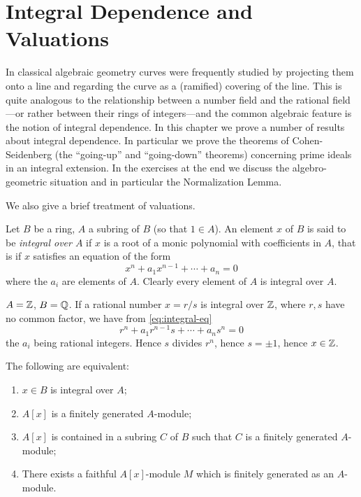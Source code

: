 \chapter{Integral Dependence and Valuations}\label{chapter5}

In classical algebraic geometry curves were frequently studied by projecting them onto a line and regarding the curve as a (ramified) covering of the line. This is quite analogous to the relationship between a number field and the rational field---or rather between their rings of integers---and the common algebraic feature is the notion of integral dependence. In this chapter we prove a number of results about integral dependence. In particular we prove the theorems of Cohen-Seidenberg (the ``going-up'' and ``going-down'' theorems) concerning prime ideals in an integral extension. In the exercises at the end we discuss the algebro-geometric situation and in particular the Normalization Lemma.

We also give a brief treatment of valuations.

Let $B$ be a ring, $A$ a subring of $B$ (so that $1 \in A$). An element $x$ of $B$ is said to be \emph{integral over $A$} if $x$ is a root of a monic polynomial with coefficients in $A$, that is if $x$ satisfies an equation of the form
\begin{equation}\label{eq:integral-eq}
x^n + a_1 x^{n-1} + \cdots + a_n = 0 \tag{1}
\end{equation}
where the $a_i$ are elements of $A$. Clearly every element of $A$ is integral over $A$.

\setcounter{theorem}{-1}
\begin{examplenumbered}\label{ex:5.0}
$A = \mathbb{Z}$, $B = \mathbb{Q}$. If a rational number $x = r/s$ is integral over $\mathbb{Z}$, where $r, s$ have no common factor, we have from \eqref{eq:integral-eq}
\[
r^n + a_1 r^{n-1} s + \cdots + a_n s^n = 0
\]
the $a_i$ being rational integers. Hence $s$ divides $r^n$, hence $s = \pm 1$, hence $x \in \mathbb{Z}$.
\end{examplenumbered}

\begin{proposition}\label{prop:5.1}
The following are equivalent:
\begin{enumerate}
    \item[i)] $x \in B$ is integral over $A$;
    \item[ii)] $A[x]$ is a finitely generated $A$-module;
    \item[iii)] $A[x]$ is contained in a subring $C$ of $B$ such that $C$ is a finitely generated $A$-module;
    \item[iv)] There exists a faithful $A[x]$-module $M$ which is finitely generated as an $A$-module.
\end{enumerate}
\end{proposition}

